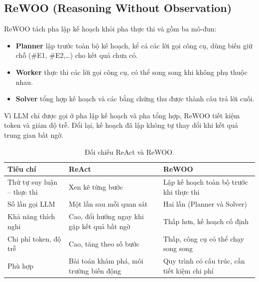 \subsection{ReWOO (Reasoning Without Observation)}
ReWOO \cite{xu_rewoo} tách pha lập kế hoạch khỏi pha thực thi và gồm ba mô-đun:
\begin{itemize}
  \item \textbf{Planner} lập trước toàn bộ kế hoạch, kể cả các lời gọi công cụ, dùng biến giữ chỗ (\#E1, \#E2,\dots)
        cho kết quả chưa có.
  \item \textbf{Worker} thực thi các lời gọi công cụ, có thể song song khi không phụ thuộc nhau.
  \item \textbf{Solver} tổng hợp kế hoạch và các bằng chứng thu được thành câu trả lời cuối.
\end{itemize}
Vì LLM chỉ được gọi ở pha lập kế hoạch và pha tổng hợp, ReWOO tiết kiệm token và giảm độ trễ. Đổi lại, kế hoạch đã lập
không tự thay đổi khi kết quả trung gian bất ngờ.


\begin{table}[!htbp]\centering
\caption{Đối chiếu ReAct và ReWOO.}\label{tab:ch3-react-rewoo}
\small
\begin{tabularx}{\linewidth}{L{3.6cm}XX}
\toprule
\textbf{Tiêu chí} & \textbf{ReAct} & \textbf{ReWOO} \\
\midrule
Thứ tự suy luận -- thực thi & Xen kẽ từng bước & Lập kế hoạch toàn bộ trước khi thực thi \\
Số lần gọi LLM & Một lần sau mỗi quan sát & Hai lần (Planner và Solver) \\
Khả năng thích nghi & Cao, đổi hướng ngay khi gặp kết quả bất ngờ & Thấp hơn, kế hoạch cố định \\
Chi phí token, độ trễ & Cao, tăng theo số bước & Thấp, công cụ có thể chạy song song \\
Phù hợp & Bài toán khám phá, môi trường biến động & Quy trình có cấu trúc, cần tiết kiệm chi phí \\
\bottomrule
\end{tabularx}
\end{table}

